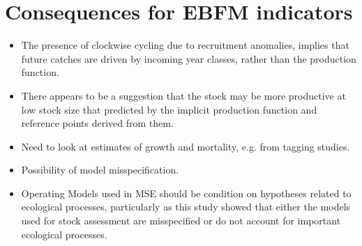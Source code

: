 \documentclass[12pt,doublespacing,a4paper]{ouparticle}
\begin{document}
\section{Consequences for EBFM indicators}


\begin{itemize}[labelindent=\parindent,noitemsep,topsep=0pt,parsep=0pt,partopsep=0pt]
\item The presence of clockwise cycling due to recruitment anomalies, implies that future catches are driven by incoming year classes, rather than the production function.
\item There appears to be a suggestion that the stock may be more productive at low stock size that predicted by the implicit production function and reference points derived from them.
\item Need to look at estimates of growth and mortality, e.g. from tagging studies.
\item Possibility of model misspecification.
\item Operating Models used in MSE should be condition on hypotheses related to ecological processes, particularly as this study showed that either the models used for stock assessment are misspecified or do not account for important ecological processes.
\end{itemize}




\end{document}
